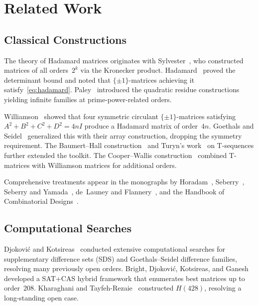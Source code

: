 \documentclass[11pt,a4paper]{article}
\begin{document}
\section{Related Work}\label{sec:related}

\subsection{Classical Constructions}

The theory of Hadamard matrices originates with
Sylvester~\cite{sylvester1867thoughts}, who constructed matrices of all
orders~$2^k$ via the Kronecker product.  Hadamard~\cite{hadamard1893resolution}
proved the determinant bound and noted that $\{\pm1\}$-matrices achieving it
satisfy~\eqref{eq:hadamard}.  Paley~\cite{paley1933orthogonal} introduced
the quadratic residue constructions yielding infinite families at
prime-power-related orders.

Williamson~\cite{williamson1944hadamard} showed that four symmetric
circulant $\{\pm1\}$-matrices satisfying $A^2 + B^2 + C^2 + D^2 = 4nI$
produce a Hadamard matrix of order~$4n$.
Goethals and Seidel~\cite{goethals1967orthogonal} generalized this with
their array construction, dropping the symmetry requirement.  The
Baumert--Hall construction~\cite{baumert1965hadamard} and Turyn's
work~\cite{turyn1972hadamard,turyn1974hadamard} on T-sequences further
extended the toolkit.  The Cooper--Wallis construction~\cite{cooper1972wallis}
combined T-matrices with Williamson matrices for additional orders.

Comprehensive treatments appear in the monographs by
Horadam~\cite{horadam2007hadamard}, Seberry~\cite{seberry2020hadamard},
Seberry and Yamada~\cite{seberry1992hadamard,seberry2020hadamard_monograph},
de~Launey and Flannery~\cite{delauney2011flannery}, and the Handbook of
Combinatorial Designs~\cite{colbourn2007handbook}.

\subsection{Computational Searches}

Djokovi\'c and Kotsireas~\cite{djokovic2018goethals,djokovic2009sds,djokovic1993williamson}
conducted extensive computational searches for supplementary difference
sets (SDS) and Goethals--Seidel difference families, resolving many
previously open orders.  Bright, Djokovi\'c, Kotsireas, and
Ganesh~\cite{bright2019sat,bright2019aaai} developed a SAT+CAS
hybrid framework that enumerates best matrices up to order~208.
Kharaghani and Tayfeh-Rezaie~\cite{kharaghani2005hadamard428} constructed
$H(428)$, resolving a long-standing open case.
\end{document}
